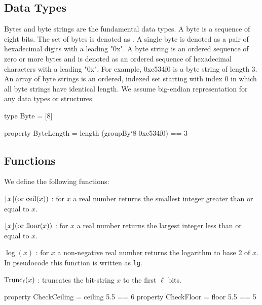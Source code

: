\subsection{Data Types}
Bytes and byte strings are the fundamental data types.  A byte is a
sequence of eight bits. The set of bytes is denoted as \byte. A single byte is 
denoted as a pair of
hexadecimal digits with a leading "0x".  A byte string is an ordered
sequence of zero or more bytes and is denoted as an ordered sequence
of hexadecimal characters with a leading "0x".  For example, 0xe534f0
is a byte string of length $3$.  An array of byte strings is an
ordered, indexed set starting with index $0$ in which all byte strings
have identical length.  We assume big-endian representation for any
data types or structures.

\begin{code}
  type Byte = [8]

  property ByteLength = length (groupBy`{8} 0xe534f0) == 3
\end{code}

\subsection{Functions}
We define the following
functions:
\begin{description}
 \item $\lceil x\rceil (\text{or }\textrm{ceil}(x))$ : for $x$ a real number returns the smallest integer greater than or equal to $x$.
 \item $\lfloor x\rfloor (\text{or }\textrm{floor}(x))$ : for $x$ a real number returns the largest integer less than or equal to $x$.
 \item $\log(x)$ : for $x$ a non-negative real number
returns the logarithm to base 2 of $x$. In pseudocode this function is written as \texttt{lg}.
 \item $\text{Trunc}_\ell(x)$ : truncates the bit-string $x$ to the first $\ell$ bits.
\end{description}

\begin{code}
  property CheckCeiling = ceiling 5.5 == 6
  property CheckFloor = floor 5.5 == 5
\end{code}


